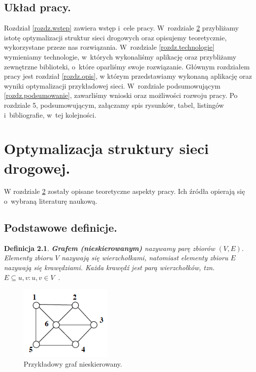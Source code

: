 \documentclass[twoside,12pt]{report}
\let\oldsection\chapter
\def\chapter{\cleardoublepage\oldsection}
\newtheorem{definition}{Definicja} %
\begin{document}
\section{Układ pracy.}
Rozdział \ref{rozdz.wstep} zawiera wstęp i~cele pracy. W~rozdziale \ref{rozdz.optymalizacja} przybliżamy istotę optymalizacji struktur sieci drogowych
oraz opisujemy teoretycznie, wykorzystane przeze nas rozwiązania. W~rozdziale \ref{rozdz.technologie} wymieniamy technologie, w~których wykonaliśmy aplikację oraz przybliżamy zewnętrzne biblioteki, o~które oparliśmy swoje rozwiązanie. Głównym rozdziałem pracy jest rozdział \ref{rozdz.opis},
w którym przedstawiamy wykonaną aplikację oraz wyniki optymalizacji przykładowej sieci. W~rozdziale podsumowującym \ref{rozdz.podsumowanie}, zawarliśmy wnioski oraz możliwości rozwoju pracy. Po rozdziale 5, podsumowującym, załączamy spis rysunków, tabel, listingów i~bibliografie, w~tej kolejności.

\chapter{Optymalizacja struktury sieci drogowej.}\label{rozdz.optymalizacja} 

W rozdziale \ref{rozdz.optymalizacja} zostały opisane teoretyczne aspekty pracy. Ich źródła opierają się o~wybraną literaturę naukową.

\section{Podstawowe definicje.}

\begin{definition}\label{Graf nieskierowany}
\textbf{Grafem (nieskierowanym)} nazywamy parę zbiorów $(V,E)$. Elementy zbioru $V$ nazywają się \textit{wierzchołkami}, natomiast elementy zbioru $E$ nazywają się \textit{krawędziami}. Każda krawędź jest parą wierzchołków, tzn. $E \subseteq {{u,v}:u,v \in V}$~\cite{grafy}.
\end{definition}

\begin{figure}[ht]
\begin{center}
\includegraphics[width=0.40\textwidth]{img/graf1}
\caption{Przykładowy graf nieskierowany.} 
\end{center}
\end{figure}
\end{document}
